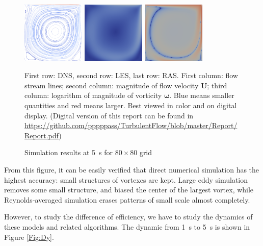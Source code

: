 \documentclass[english, nochinese]{pkupaper}
\begin{document}
\begin{figure}[htbp]
{{
\includegraphics[width=3cm]{Results/Figure01h.png}
\includegraphics[width=3cm]{Results/Figure01g.png}
\includegraphics[width=3cm]{Results/Figure02o.png}
}
\caption{Simulation results at \SI{5}{s} for $ 80 \times 80 $ grid}
\label{Fig:Over}
}
{
\footnotesize
First row: DNS, second row: LES, last row: RAS. First column: flow stream lines; second column: magnitude of flow velocity $\mathbf{U}$; third column: logarithm of magnitude of vorticity $\bm{\omega}$. Blue means smaller quantities and red means larger. Best viewed in color and on digital display. (Digital version of this report can be found in \url{https://github.com/pppppass/TurbulentFlow/blob/master/Report/Report.pdf})
}
\end{figure}

From this figure, it can be easily verified that direct numerical simulation has the highest accuracy: small structures of vortexes are kept. Large eddy simulation removes some small structure, and biased the center of the largest vortex, while Reynolds-averaged simulation erases patterns of small scale almost completely.

However, to study the difference of efficiency, we have to study the dynamics of these models and related algorithms. The dynamic from \SI{1}{\second} to \SI{5}{\second} is shown in Figure \ref{Fig:Dy}.
\end{document}
